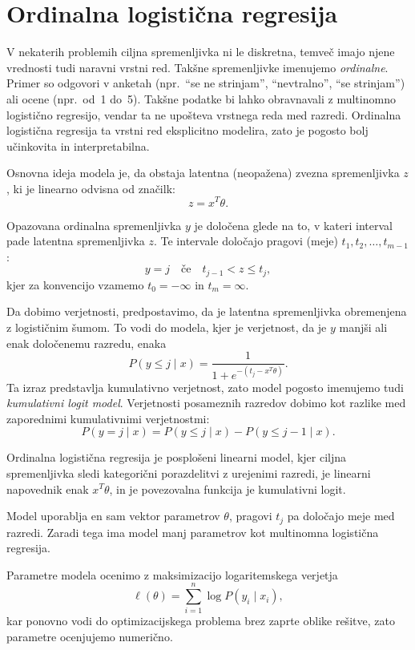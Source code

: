 \section{Ordinalna logistična regresija}

V nekaterih problemih ciljna spremenljivka ni le diskretna, temveč imajo njene vrednosti tudi naravni vrstni red. Takšne spremenljivke imenujemo \emph{ordinalne}. Primer so odgovori v anketah (npr.\ ``se ne strinjam'', ``nevtralno'', ``se strinjam'') ali ocene (npr.\ od~1 do~5). Takšne podatke bi lahko obravnavali z multinomno logistično regresijo, vendar ta ne upošteva vrstnega reda med razredi. Ordinalna logistična regresija ta vrstni red eksplicitno modelira, zato je pogosto bolj učinkovita in interpretabilna.

Osnovna ideja modela je, da obstaja latentna (neopažena) zvezna spremenljivka $z$, ki je linearno odvisna od značilk:
\[
z = x^T \theta.
\]

Opazovana ordinalna spremenljivka $y$ je določena glede na to, v kateri interval pade latentna spremenljivka $z$. Te intervale določajo pragovi (meje) $t_1, t_2, \dots, t_{m-1}$:
\[
y = j \quad \text{če} \quad t_{j-1} < z \le t_j,
\]
kjer za konvencijo vzamemo $t_0 = -\infty$ in $t_m = \infty$.

Da dobimo verjetnosti, predpostavimo, da je latentna spremenljivka obremenjena z logističnim šumom. To vodi do modela, kjer je verjetnost, da je $y$ manjši ali enak določenemu razredu, enaka
\[
P(y \le j \mid x) = \frac{1}{1 + e^{-(t_j - x^T\theta)}}.
\]
Ta izraz predstavlja kumulativno verjetnost, zato model pogosto imenujemo tudi \emph{kumulativni logit model}. Verjetnosti posameznih razredov dobimo kot razlike med zaporednimi kumulativnimi verjetnostmi:
\[
P(y = j \mid x) = P(y \le j \mid x) - P(y \le j-1 \mid x).
\]

Ordinalna logistična regresija je posplošeni linearni model, kjer ciljna spremenljivka sledi kategorični porazdelitvi z urejenimi razredi, je linearni napovednik enak $x^T\theta$, in je povezovalna funkcija je kumulativni logit.

Model uporablja en sam vektor parametrov $\theta$, pragovi $t_j$ pa določajo meje med razredi. Zaradi tega ima model manj parametrov kot multinomna logistična regresija.

Parametre modela ocenimo z maksimizacijo logaritemskega verjetja
\[
\ell(\theta) = \sum_{i=1}^n \log P(y_i \mid x_i),
\]
kar ponovno vodi do optimizacijskega problema brez zaprte oblike rešitve, zato parametre ocenjujemo numerično.


